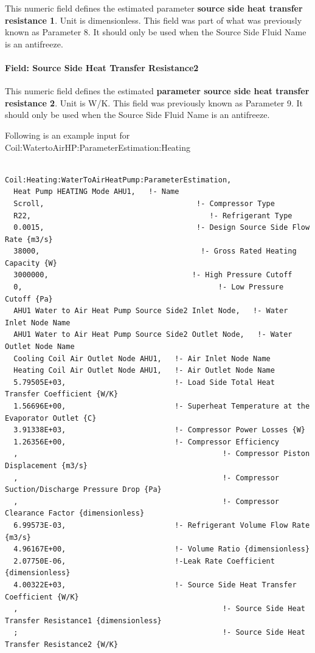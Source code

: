 This numeric field defines the estimated parameter \textbf{source side heat transfer resistance 1}. Unit is dimensionless. This field was part of what was previously known as Parameter 8. It should only be used when the Source Side Fluid Name is an antifreeze.

\paragraph{Field: Source Side Heat Transfer Resistance2}\label{field-source-side-heat-transfer-resistance2-1}

This numeric field defines the estimated \textbf{parameter source side heat transfer resistance 2}. Unit is W/K. This field was previously known as Parameter 9. It should only be used when the Source Side Fluid Name is an antifreeze.

Following is an example input for Coil:WatertoAirHP:ParameterEstimation:Heating

\begin{lstlisting}

Coil:Heating:WaterToAirHeatPump:ParameterEstimation,
  Heat Pump HEATING Mode AHU1,   !- Name
  Scroll,                                   !- Compressor Type
  R22,                                         !- Refrigerant Type
  0.0015,                                   !- Design Source Side Flow Rate {m3/s}
  38000,                                     !- Gross Rated Heating Capacity {W}
  3000000,                                 !- High Pressure Cutoff
  0,                                             !- Low Pressure Cutoff {Pa}
  AHU1 Water to Air Heat Pump Source Side2 Inlet Node,   !- Water Inlet Node Name
  AHU1 Water to Air Heat Pump Source Side2 Outlet Node,   !- Water Outlet Node Name
  Cooling Coil Air Outlet Node AHU1,   !- Air Inlet Node Name
  Heating Coil Air Outlet Node AHU1,   !- Air Outlet Node Name
  5.79505E+03,                         !- Load Side Total Heat Transfer Coefficient {W/K}
  1.56696E+00,                         !- Superheat Temperature at the Evaporator Outlet {C}
  3.91338E+03,                         !- Compressor Power Losses {W}
  1.26356E+00,                         !- Compressor Efficiency
  ,                                               !- Compressor Piston Displacement {m3/s}
  ,                                               !- Compressor Suction/Discharge Pressure Drop {Pa}
  ,                                               !- Compressor Clearance Factor {dimensionless}
  6.99573E-03,                         !- Refrigerant Volume Flow Rate {m3/s}
  4.96167E+00,                         !- Volume Ratio {dimensionless}
  2.07750E-06,                         !-Leak Rate Coefficient {dimensionless}
  4.00322E+03,                         !- Source Side Heat Transfer Coefficient {W/K}
  ,                                               !- Source Side Heat Transfer Resistance1 {dimensionless}
  ;                                               !- Source Side Heat Transfer Resistance2 {W/K}
\end{lstlisting}

